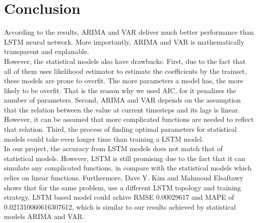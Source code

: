 \documentclass[11pt]{article}
\begin{document}
\section{Conclusion}
According to the results, ARIMA and VAR deliver much better performance than LSTM
neural network. More importantly, ARIMA and VAR is mathematically transparent
and explanable.\\
However, the statistical models also have drawbacks. First, due to the fact that
all of them uses likelihood estimator to estimate the coefficients by the
trainset, these models are prone to overfit. The more parameters a model has,
the more likely to be overfit. That is the reason why we used AIC, for it
penalizes the number of parameters. Second, ARIMA and VAR depends on the assumption
that the relation between the value at current timesteps and its lags is linear.
However, it can be assumed that more complicated functions are needed to reflect
that relation. Third, the process of finding optimal parameters for statistical
models could take even longer time than training a LSTM model.\\
In our project, the accuracy from LSTM models does not match that of statistical
models. However, LSTM is still promising due to the fact that it can simulate
any complicated functions, in compare with the statistical models which relies
on linear functions. Furthermore, Dave Y. Kim and Mahmoud Elsaftawy
\cite{kimy07lstm} shows that for the same problem, use a different LSTM topology
and training strategy, LSTM based model could achive RMSE 0.00029617
and MAPE of 0.021310060616307612, which is similar to our results achieved by
statistical models ARIMA and VAR.
\pagebreak 


\end{document}
